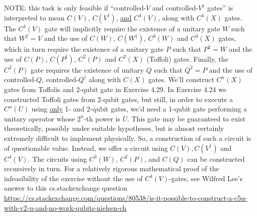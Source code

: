 \Soln NOTE: this task is only feasible if ``controlled-$V$ and controlled-$V^\dagger$ gates'' is interpreted to mean $C(V)$, $C(V^\dagger)$, \underline{and} $C^4(V)$, along with $C^4(X)$ gates. The $C^4(V)$ gate will implicitly require the existence of a unitary gate $W$ such that $W^2=V$ and the use of $C(W)$, $C(W^\dagger)$, $C^3(W)$ and $C^3(X)$ gates, which in turn require the existence of a unitary gate $P$ such that $P^2=W$ and the use of $C(P)$, $C(P^\dagger)$, $C^2(P)$ and $C^2(X)$ (Toffoli) gates.  Finally, the $C^2(P)$ gate requires the existence of unitary $Q$ such that $Q^2=P$ and the use of controlled-$Q$, controlled-$Q^\dagger$ along with $C(X)$ gates.  We'll construct $C^n(X)$ gates from Toffolis and 2-qubit gate in Exercise 4.29.  In Exercise 4.24 we constructed Toffoli gates from 2-qubit gates, but still, in order to execute a $C^n(U)$ using \underline{only} 1- and 2-qubit gates, we'd need a 1-qubit gate performing a unitary operator whose $2^n$-th power is $U$.  This gate may be guaranteed to exist theoretically, possibly under suitable hypotheses, but is almost certainly extremely difficult to implement physically.  So, a construction of such a circuit is of questionable value.  Instead, we offer a circuit using $C(V), C(V^\dagger)$ and $C^4(V)$.  The circuits using $C^3(W)$, $C^2(P)$, and $C(Q)$ can be constructed recursively in turn.  For a relatively rigorous mathematical proof of the infeasibility of the exercise without the use of $C^4(V)$-gates, see Wilfred Lee's answer to this cs.stackexchange question \href{_}\url{https://cs.stackexchange.com/questions/80538/is-it-possible-to-construct-a-c5u-with-v2-u-and-no-work-qubits-nielsen-ch}

